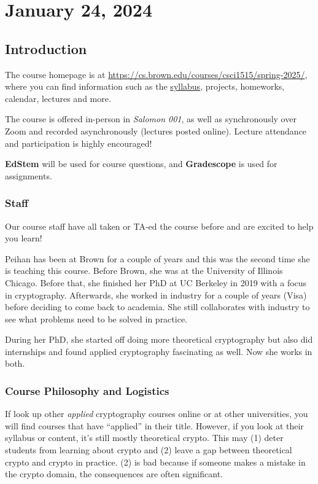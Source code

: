 \section{January 24, 2024}
\label{20240124}

\subsection{Introduction}
The course homepage is at \url{https://cs.brown.edu/courses/csci1515/spring-2025/}, where you can find information such as the \href{https://docs.google.com/document/d/1lvXrMACua9Ma3n2nkLeiRmG-fmjDO1530h22EjkvQ-s/edit?usp=sharing}{syllabus}, projects, homeworks, calendar, lectures and more.

The course is offered in-person in \emph{Salomon 001}, as well as synchronously over Zoom and recorded asynchronously (lectures posted online). Lecture attendance and participation is highly encouraged!

\textbf{EdStem} will be used for course questions, and \textbf{Gradescope} is used for assignments.

\subsubsection{Staff}

Our course staff have all taken or TA-ed the course before and are excited to help you learn!

Peihan has been at Brown for a couple of years and this was the second time she is teaching this course. Before Brown, she was at the University of Illinois Chicago. Before that, she finished her PhD at UC Berkeley in 2019 with a focus in cryptography. Afterwards, she worked in industry for a couple of years (Visa) before deciding to come back to academia. She still collaborates with industry to see what problems need to be solved in practice.

During her PhD, she started off doing more theoretical cryptography but also did internships and found applied cryptography fascinating as well. Now she works in both.

\subsubsection{Course Philosophy and Logistics}

If look up other \emph{applied} cryptography courses online or at other universities, you will find courses that have ``applied'' in their title. However, if you look at their syllabus or content, it's still mostly theoretical crypto. This may (1) deter students from learning about crypto and (2) leave a gap between theoretical crypto and crypto in practice. (2) is bad because if someone makes a mistake in the crypto domain, the consequences are often significant.

